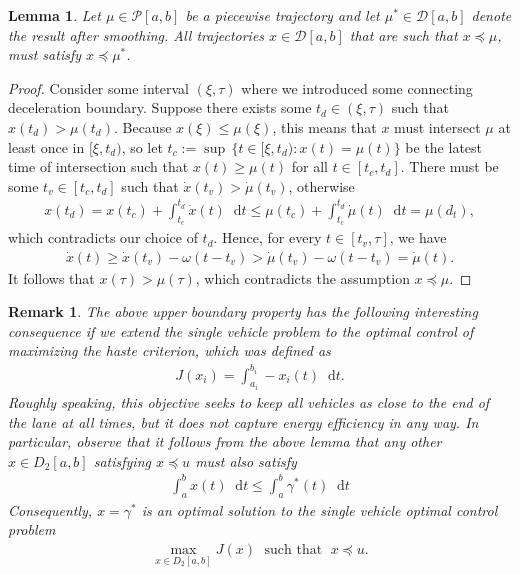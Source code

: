 \documentclass{report}
\theoremstyle{definition}
\theoremstyle{plain}
\newtheorem{lemma}{Lemma}[chapter]
\newtheorem*{remark}{Remark}
\newcommand\halfopen[2]{\ensuremath{[#1,#2)}}
\newcommand*\diff{\mathop{}\!\mathrm{d}}
\begin{document}
\begin{lemma}\label{lemma:upperbound}
  Let $\mu \in \mathcal{P}[a,b]$ be a piecewise trajectory and let
  $\mu^{*} \in \mathcal{D}[a,b]$ denote the result after smoothing. All
  trajectories $x \in \mathcal{D}[a, b]$ that are such that
  $x \preceq \mu$, must satisfy $x \preceq \mu^{*}$.
\end{lemma}
\begin{proof}
  Consider some interval $(\xi, \tau)$ where we introduced some connecting
  deceleration boundary. Suppose there exists some $t_{d} \in (\xi, \tau)$ such that
  $x(t_{d}) > \mu(t_{d})$. Because $x(\xi) \leq \mu(\xi)$, this means that $x$ must
  intersect $\mu$ at least once in $\halfopen{\xi}{t_{d}}$, so let
  $t_{c} := \sup \, \{ t \in \halfopen{\xi}{t_{d}} : x(t) = \mu(t) \}$ be the latest
  time of intersection such that $x(t) \geq \mu(t)$ for all $t \in [t_{c}, t_{d}]$.
  There must be some $t_{v} \in [t_{c}, t_{d}]$ such that $\dot{x}(t_{v}) > \dot{\mu}(t_{v})$,
  otherwise
  \begin{align*}
    x(t_{d}) = x(t_{c}) + \int_{t_{c}}^{t_{d}} \dot{x}(t) \diff t \leq \mu(t_{c}) + \int_{t_{c}}^{t_{d}} \dot{\mu}(t) \diff t = \mu(d_{t}) ,
  \end{align*}
  which contradicts our choice of $t_{d}$. Hence, for every
  $t \in [t_{v}, \tau]$, we have
  \begin{align*}
    \dot{x}(t) \geq \dot{x}(t_{v}) - \omega (t - t_{v}) > \dot{\mu}(t_{v}) - \omega(t - t_{v}) = \dot{\mu}(t) .
  \end{align*}
  It follows that $x(\tau) > \mu(\tau)$, which contradicts the assumption
  $x \preceq \mu$.
\end{proof}

\begin{remark}
  The above upper boundary property has the following interesting consequence if
  we extend the single vehicle problem to the optimal control of maximizing the
  haste criterion, which was defined as
  \begin{align}\label{eq:haste-objective}
  J(x_{i}) = \int_{a_{i}}^{b_{i}} - x_{i}(t) \diff t .
  \end{align}
  Roughly speaking, this objective seeks to keep all vehicles as close to the end
  of the lane at all times, but it does not capture energy efficiency in any way.
  In particular, observe that it follows from the above lemma that any other
  $x \in D_{2}[a,b]$ satisfying $x \preceq u$ must also satisfy
  \begin{align}
    \int_{a}^{b} x(t) \diff t \leq \int_{a}^{b} \gamma^{*}(t) \diff t
  \end{align}
  Consequently, $x = \gamma^{*}$ is an optimal solution to the single vehicle
  optimal control problem
  \begin{align}
    \max_{x \in D_{2}[a,b]} J(x) \; \text{ such that } \; x \preceq u .
  \end{align}

\end{remark}
\end{document}
